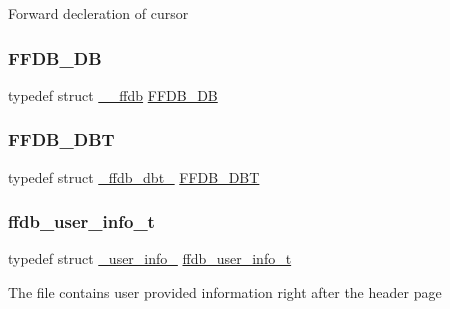 Forward decleration of cursor \mbox{\label{adat-devel_2other__libs_2filedb_2filehash_2ffdb__db_8h_a0b27b956926453a7a8141ea8e10f0df8}} 
\subsubsection{\texorpdfstring{FFDB\_DB}{FFDB\_DB}}
{\footnotesize\ttfamily typedef struct \mbox{\hyperlink{struct____ffdb}{\+\_\+\+\_\+ffdb}}  \mbox{\hyperlink{adat-devel_2other__libs_2filedb_2filehash_2ffdb__db_8h_a0b27b956926453a7a8141ea8e10f0df8}{F\+F\+D\+B\+\_\+\+DB}}}

\mbox{\label{adat-devel_2other__libs_2filedb_2filehash_2ffdb__db_8h_aa2e0984399491df0fdd20898ca8758f9}} 
\subsubsection{\texorpdfstring{FFDB\_DBT}{FFDB\_DBT}}
{\footnotesize\ttfamily typedef struct \mbox{\hyperlink{struct__ffdb__dbt__}{\+\_\+ffdb\+\_\+dbt\+\_\+}} \mbox{\hyperlink{adat-devel_2other__libs_2filedb_2filehash_2ffdb__db_8h_aa2e0984399491df0fdd20898ca8758f9}{F\+F\+D\+B\+\_\+\+D\+BT}}}

\mbox{\label{adat-devel_2other__libs_2filedb_2filehash_2ffdb__db_8h_adcd7ce6dd6eeea724d6b6f56b37ee0f9}} 
\subsubsection{\texorpdfstring{ffdb\_user\_info\_t}{ffdb\_user\_info\_t}}
{\footnotesize\ttfamily typedef struct \mbox{\hyperlink{struct__user__info__}{\+\_\+user\+\_\+info\+\_\+}} \mbox{\hyperlink{adat-devel_2other__libs_2filedb_2filehash_2ffdb__db_8h_adcd7ce6dd6eeea724d6b6f56b37ee0f9}{ffdb\+\_\+user\+\_\+info\+\_\+t}}}

The file contains user provided information right after the header page \mbox{\label{adat-devel_2other__libs_2filedb_2filehash_2ffdb__db_8h_a09ffd06672b99d3312cd7e19d4b05e45}} 

